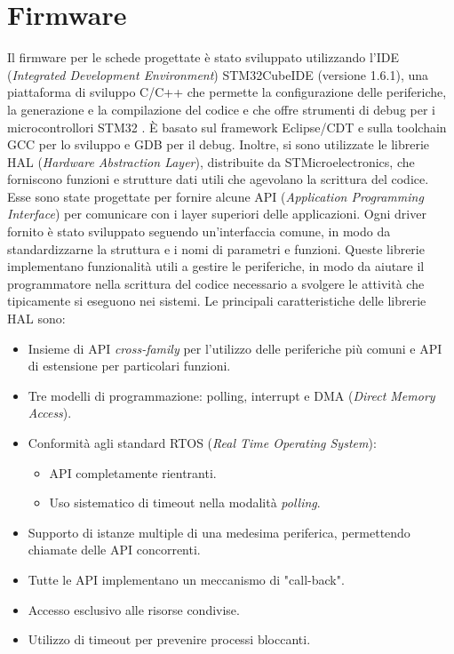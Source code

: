 \section{Firmware}\label{sec:Firmware}
Il firmware per le schede progettate è stato sviluppato utilizzando l'IDE (\textit{Integrated Development Environment}) STM32CubeIDE (versione 1.6.1), una piattaforma di sviluppo C/C++ che permette la configurazione delle periferiche, la generazione e la compilazione del codice e che offre strumenti di debug per i microcontrollori STM32 \cite{STMicroelectronicsSTM32CubeIDE}. \`E basato sul framework Eclipse\textregistered/CDT e sulla toolchain GCC per lo sviluppo e GDB per il debug. Inoltre, si sono utilizzate le librerie HAL (\textit{Hardware Abstraction Layer}), distribuite da STMicroelectronics, che forniscono funzioni e strutture dati utili che agevolano la scrittura del codice. Esse sono state progettate per fornire alcune API (\textit{Application Programming Interface}) per comunicare con i layer superiori delle applicazioni\cite{STMicroelectronicsHAL}. Ogni driver fornito è stato sviluppato seguendo un'interfaccia comune, in modo da standardizzarne la struttura e i nomi di parametri e funzioni. Queste librerie implementano funzionalità utili a gestire le periferiche, in modo da aiutare il programmatore nella scrittura del codice necessario a svolgere le attività che tipicamente si eseguono nei sistemi.
Le principali caratteristiche delle librerie HAL sono:
\begin{itemize}
	\item Insieme di API \textit{cross-family} per l'utilizzo delle periferiche più comuni e API di estensione per particolari funzioni.
	\item Tre modelli di programmazione: polling, interrupt e DMA (\textit{Direct Memory Access}).
	\item Conformità agli standard RTOS (\textit{Real Time Operating System}):
	\begin{itemize}
		\item API completamente rientranti.
		\item Uso sistematico di timeout nella modalità \textit{polling}.
	\end{itemize}
	\item Supporto di istanze multiple di una medesima periferica, permettendo chiamate delle API concorrenti.
	\item Tutte le API implementano un meccanismo di "call-back".
	\item Accesso esclusivo alle risorse condivise.
	\item Utilizzo di timeout per prevenire processi bloccanti.
\end{itemize}

